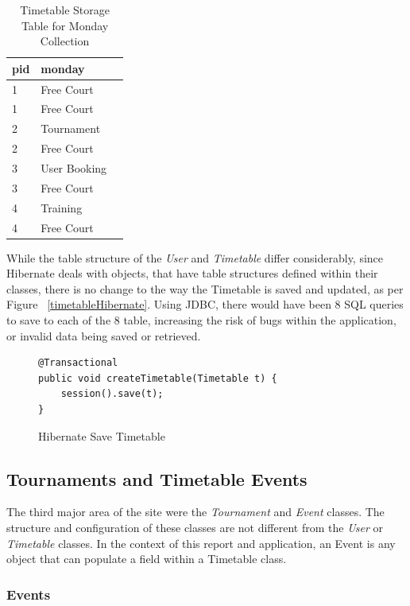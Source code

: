 \begin{table}
	\caption{Timetable Storage Table for Monday Collection}
\begin {center}
    \begin{tabular}{| l | l | p{.8cm} |}
	\hline
	pid & monday \\ \hline
	1 & Free Court \\ \hline
	1 & Free Court \\ \hline
	2 & Tournament \\ \hline
	2 & Free Court \\ \hline
	3 & User Booking \\ \hline
	3 & Free Court \\ \hline
	4 & Training \\ \hline
	4 & Free Court \\ \hline
	\end{tabular}
	\end{center}
\end{table}

While the table structure of the \textit{User} and \textit{Timetable} differ considerably, since Hibernate deals with objects, that have table structures defined within their classes, there is no change to the way the Timetable is saved and updated, as per Figure ~\ref{timetableHibernate}. Using JDBC, there would have been 8 SQL queries to save to each of the 8 table, increasing the risk of bugs within the application, or invalid data being saved or retrieved.

\begin{figure}[H]
\begin{lstlisting}
@Transactional
public void createTimetable(Timetable t) {
	session().save(t);
}
\end{lstlisting}
\caption{Hibernate Save Timetable}
\label{fig:timetableHibernate}
\end{figure}

\subsection{Tournaments and Timetable Events}

The third major area of the site were the \textit{Tournament} and \textit{Event} classes. The structure and configuration of these classes are not different from the \textit{User} or \textit{Timetable} classes. In the context of this report and application, an Event is any object that can populate a field within a Timetable class. 

\subsubsection{Events}


